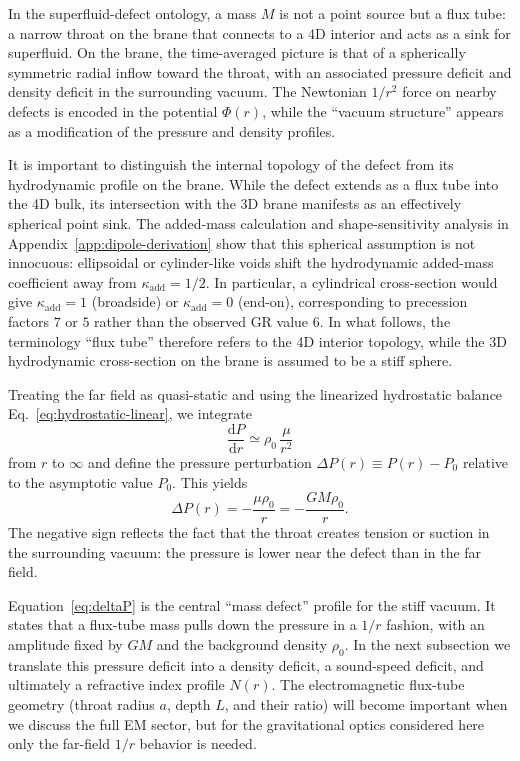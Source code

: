 \documentclass[11pt]{article}
\begin{document}
In the superfluid-defect ontology, a mass $M$ is not a point source but a
flux tube: a narrow throat on the brane that connects to a 4D interior and
acts as a sink for superfluid.
On the brane, the time-averaged picture is that of a spherically symmetric
radial inflow toward the throat, with an associated pressure deficit and
density deficit in the surrounding vacuum.
The Newtonian $1/r^2$ force on nearby defects is encoded in the potential
$\Phi(r)$, while the ``vacuum structure'' appears as a modification of the
pressure and density profiles.

It is important to distinguish the internal topology of the defect from its
hydrodynamic profile on the brane.
While the defect extends as a flux tube into the 4D bulk, its intersection
with the 3D brane manifests as an effectively spherical point sink.
The added-mass calculation and shape-sensitivity analysis in
Appendix~\ref{app:dipole-derivation} show that this spherical assumption is
not innocuous: ellipsoidal or cylinder-like voids shift the hydrodynamic
added-mass coefficient away from $\kappa_{\mathrm{add}} = 1/2$.
In particular, a cylindrical cross-section would give
$\kappa_{\mathrm{add}} = 1$ (broadside) or $\kappa_{\mathrm{add}} = 0$
(end-on), corresponding to precession factors $7$ or $5$ rather than the
observed GR value $6$.
In what follows, the terminology ``flux tube'' therefore refers to the 4D
interior topology, while the 3D hydrodynamic cross-section on the brane is
assumed to be a stiff sphere.

Treating the far field as quasi-static and using the linearized hydrostatic
balance Eq.~\eqref{eq:hydrostatic-linear}, we integrate
\begin{equation}
  \frac{\mathrm{d}P}{\mathrm{d}r}
  \simeq \rho_0\,\frac{\mu}{r^2}
\end{equation}
from $r$ to $\infty$ and define the pressure perturbation
$\Delta P(r) \equiv P(r) - P_0$ relative to the asymptotic value $P_0$.
This yields
\begin{equation}
  \Delta P(r)
  = - \frac{\mu \rho_0}{r}
  = - \frac{GM \rho_0}{r}.
  \label{eq:deltaP}
\end{equation}
The negative sign reflects the fact that the throat creates tension or
suction in the surrounding vacuum: the pressure is lower near the defect
than in the far field.

Equation~\eqref{eq:deltaP} is the central ``mass defect'' profile for the
stiff vacuum.
It states that a flux-tube mass pulls down the pressure in a $1/r$ fashion,
with an amplitude fixed by $GM$ and the background density $\rho_0$.
In the next subsection we translate this pressure deficit into a density
deficit, a sound-speed deficit, and ultimately a refractive index profile
$N(r)$.
The electromagnetic flux-tube geometry (throat radius $a$, depth $L$, and
their ratio) will become important when we discuss the full EM sector, but
for the gravitational optics considered here only the far-field $1/r$
behavior is needed.
\end{document}
